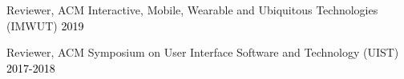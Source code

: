 Reviewer, ACM Interactive, Mobile, Wearable and Ubiquitous Technologies (IMWUT) \hfill \textcolor{black}{2019}

Reviewer, ACM Symposium on User Interface Software and Technology (UIST) \hfill \textcolor{black}{2017-2018}\\










\pagebreak

%







%
%
%
%
%
%

